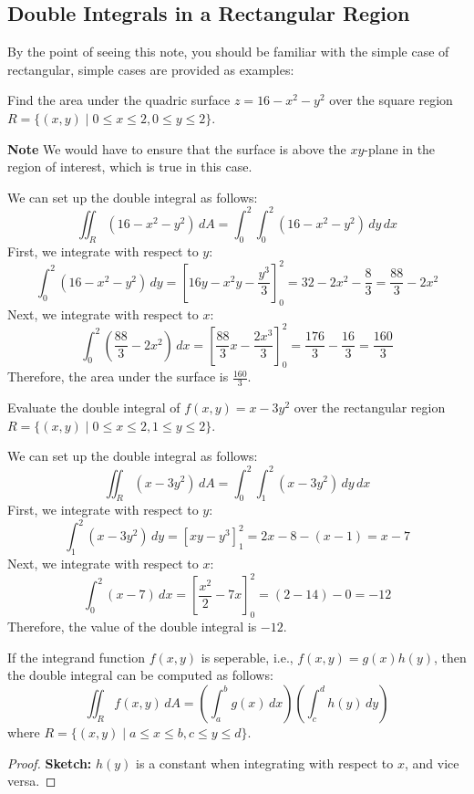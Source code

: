 \documentclass[11pt]{report}
\begin{document}
\subsection{Double Integrals in a Rectangular Region}

 By the point of seeing this note, you should be familiar with the simple case of rectangular, simple cases are provided as examples:

\begin{example}
    Find the area under the quadric surface $z = 16 - x^2 - y^2$ over the square region $R = \{ (x,y) \mid 0 \le x \le 2, 0 \le y \le 2\}$.

    \textbf{Note} We would have to ensure that the surface is above the $xy$-plane in the region of interest, which is true in this case.

    We can set up the double integral as follows:
    $$
        \iint_R (16 - x^2 - y^2) \, dA = \int_0^2 \int_0^2 (16 - x^2
        - y^2) \, dy \, dx
    $$
    First, we integrate with respect to $y$:
    $$
        \int_0^2 (16 - x^2 - y^2) \, dy = \left[ 16y - x^2y - \frac{y^3}{3} \right]_0^2 = 32 - 2x^2 - \frac{8}{3} = \frac{88}{3} - 2x^2
    $$
    Next, we integrate with respect to $x$:
    $$
        \int_0^2 \left( \frac{88}{3} - 2x^2 \right) \, dx = \left[ \frac{88}{3}x - \frac{2x^3}{3} \right]_0^2 = \frac{176}{3} - \frac{16}{3} = \frac{160}{3}
    $$
    Therefore, the area under the surface is $\frac{160}{3}$.

\end{example}

\begin{example}
    Evaluate the double integral of $f(x,y) = x - 3y^2$ over the rectangular region $R = \{ (x,y) \mid 0 \le x \le 2, 1 \le y \le 2\}$.

    We can set up the double integral as follows:
    $$
        \iint_R (x - 3y^2) \, dA = \int_0^2 \int_1^2 (x - 3y^2) \, dy \, dx
    $$
    First, we integrate with respect to $y$:
    $$
        \int_1^2 (x - 3y^2) \, dy = \left[ xy - y^3 \right]_1^2 = 2x - 8 - (x - 1) = x - 7
    $$
    Next, we integrate with respect to $x$:
    $$
        \int_0^2 (x - 7) \, dx = \left[ \frac{x^2}{2} - 7x \right]_0^2 = \left( 2 - 14 \right) - 0 = -12
    $$
    Therefore, the value of the double integral is $-12$.
\end{example}

\begin{theorem}
    If the integrand function $f(x,y)$ is seperable, i.e., $f(x,y) = g(x)h(y)$, then the double integral can be computed as follows:
    \begin{equation}
        \iint_R f(x,y) \, dA = \left( \int_a^b g(x) \, dx \right) \left( \int_c^d h(y) \, dy \right)
    \end{equation}
    where $R = \{ (x,y) \mid a \le x \le b, c \le y \le d \}$.
\end{theorem}
\begin{proof}
    \textbf{Sketch:} $h(y)$ is a constant when integrating with respect to $x$, and vice versa.
\end{proof}
\end{document}
